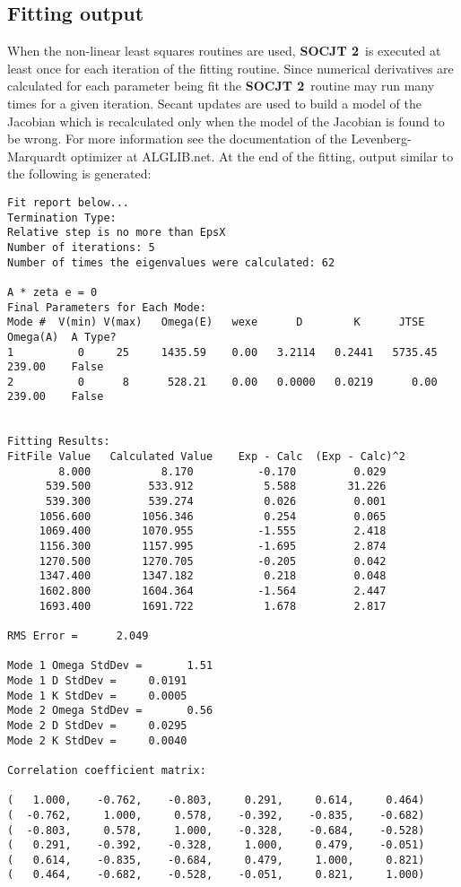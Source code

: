 \documentclass{article}
\newcommand{\socjttwo}{{\bf SOCJT 2}}
\begin{document}
\subsection{Fitting output}

When the non-linear least squares routines are used, \socjttwo\ is
executed at least once for each iteration of the fitting routine. Since numerical derivatives are calculated for each parameter being fit the \socjttwo\ routine may run many times for a given iteration. Secant updates are used to build a model of the Jacobian which is recalculated only when the model of the Jacobian is found to be wrong. For more information see the documentation of the Levenberg-Marquardt optimizer at ALGLIB.net\cite{alglib}. At the end of
the fitting, output similar to the following is generated:
\begin{verbatim}
Fit report below...
Termination Type: 
Relative step is no more than EpsX 
Number of iterations: 5
Number of times the eigenvalues were calculated: 62
 
A * zeta e = 0
Final Parameters for Each Mode:
Mode #  V(min) V(max)   Omega(E)   wexe      D        K      JTSE   Omega(A)  A Type?
1          0     25     1435.59    0.00   3.2114   0.2441   5735.45   239.00    False
2          0      8      528.21    0.00   0.0000   0.0219      0.00   239.00    False
  
  
Fitting Results:
FitFile Value	Calculated Value	Exp - Calc	(Exp - Calc)^2
        8.000	        8.170		   -0.170	      0.029
      539.500	      533.912		    5.588	     31.226
      539.300	      539.274		    0.026	      0.001
     1056.600	     1056.346		    0.254	      0.065
     1069.400	     1070.955		   -1.555	      2.418
     1156.300	     1157.995		   -1.695	      2.874
     1270.500	     1270.705		   -0.205	      0.042
     1347.400	     1347.182		    0.218	      0.048
     1602.800	     1604.364		   -1.564	      2.447
     1693.400	     1691.722		    1.678	      2.817
  
RMS Error =      2.049
  
Mode 1 Omega StdDev =       1.51
Mode 1 D StdDev =     0.0191
Mode 1 K StdDev =     0.0005
Mode 2 Omega StdDev =       0.56
Mode 2 D StdDev =     0.0295
Mode 2 K StdDev =     0.0040
 
Correlation coefficient matrix:

(   1.000,    -0.762,    -0.803,     0.291,     0.614,     0.464)
(  -0.762,     1.000,     0.578,    -0.392,    -0.835,    -0.682)
(  -0.803,     0.578,     1.000,    -0.328,    -0.684,    -0.528)
(   0.291,    -0.392,    -0.328,     1.000,     0.479,    -0.051)
(   0.614,    -0.835,    -0.684,     0.479,     1.000,     0.821)
(   0.464,    -0.682,    -0.528,    -0.051,     0.821,     1.000) 
\end{verbatim}
\end{document}
